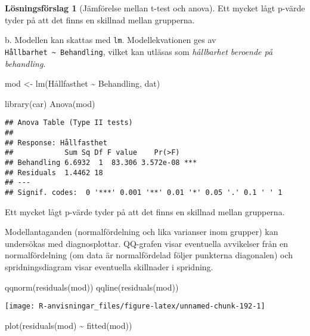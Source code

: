 \documentclass[
]{book}
\newenvironment{Shaded}{\begin{snugshade}}{\end{snugshade}}
\newcommand{\FunctionTok}[1]{\textcolor[rgb]{0.00,0.00,0.00}{#1}}
\newcommand{\NormalTok}[1]{#1}
\newcommand{\OtherTok}[1]{\textcolor[rgb]{0.56,0.35,0.01}{#1}}
\newcommand{\SpecialCharTok}[1]{\textcolor[rgb]{0.00,0.00,0.00}{#1}}
\theoremstyle{definition}
\theoremstyle{definition}
\theoremstyle{definition}
\theoremstyle{definition}
\newtheorem{hypothesis}{Lösningsförslag}[chapter]
\theoremstyle{remark}
\begin{document}
\begin{hypothesis}[Jämförelse mellan t-test och anova]
Ett mycket lågt p-värde tyder på att det finns en skillnad mellan grupperna.

b. Modellen kan skattas med \texttt{lm}. Modellekvationen ges av \texttt{Hållbarhet\ \textasciitilde{}\ Behandling}, vilket kan utläsas som \emph{hållbarhet beroende på behandling}.

\begin{Shaded}
\begin{Highlighting}[]
\NormalTok{mod }\OtherTok{\textless{}{-}} \FunctionTok{lm}\NormalTok{(Hållfasthet }\SpecialCharTok{\textasciitilde{}}\NormalTok{ Behandling, dat)}

\FunctionTok{library}\NormalTok{(car)}
\FunctionTok{Anova}\NormalTok{(mod)}
\end{Highlighting}
\end{Shaded}

\begin{verbatim}
## Anova Table (Type II tests)
## 
## Response: Hållfasthet
##            Sum Sq Df F value    Pr(>F)    
## Behandling 6.6932  1  83.306 3.572e-08 ***
## Residuals  1.4462 18                      
## ---
## Signif. codes:  0 '***' 0.001 '**' 0.01 '*' 0.05 '.' 0.1 ' ' 1
\end{verbatim}

Ett mycket lågt p-värde tyder på att det finns en skillnad mellan grupperna.

Modellantaganden (normalfördelning och lika varianser inom grupper) kan undersökas med diagnosplottar. QQ-grafen visar eventuella avvikelser från en normalfördelning (om data är normalfördelad följer punkterna diagonalen) och spridningsdiagram visar eventuella skillnader i spridning.

\begin{Shaded}
\begin{Highlighting}[]
\FunctionTok{qqnorm}\NormalTok{(}\FunctionTok{residuals}\NormalTok{(mod))}
\FunctionTok{qqline}\NormalTok{(}\FunctionTok{residuals}\NormalTok{(mod))}
\end{Highlighting}
\end{Shaded}

\begin{center}\texttt{[image: R-anvisningar\_files/figure-latex/unnamed-chunk-192-1]} \end{center}

\begin{Shaded}
\begin{Highlighting}[]
\FunctionTok{plot}\NormalTok{(}\FunctionTok{residuals}\NormalTok{(mod) }\SpecialCharTok{\textasciitilde{}} \FunctionTok{fitted}\NormalTok{(mod))}
\end{Highlighting}
\end{Shaded}


\end{hypothesis}
\end{document}

